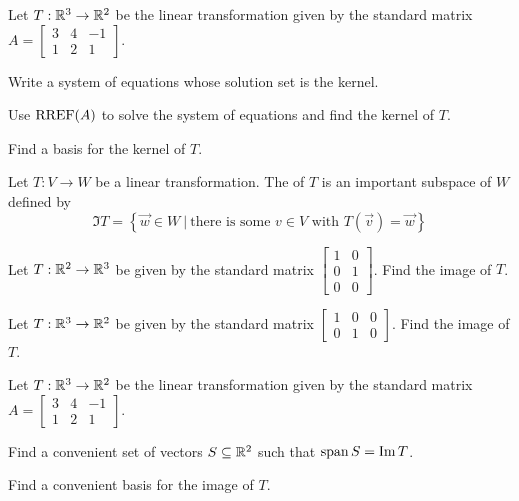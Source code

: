 \begin{applicationActivities}
\begin{activity}{10}
Let $T: \mathbb{R}^3 \rightarrow \mathbb{R}^2$ be the linear transformation given by the standard matrix $A=\begin{bmatrix} 3 & 4 & -1 \\ 1 & 2 & 1 \end{bmatrix}$.
\begin{subactivity}
Write a system of equations whose solution set is the kernel.
\end{subactivity}
\begin{subactivity}
Use $\operatorname{RREF}(A)$ to solve the system of equations and find the kernel of \(T\).
\end{subactivity}
\begin{subactivity}
Find a basis for the kernel of $T$.
\end{subactivity}
\end{activity}


\begin{definition}
Let $T: V \rightarrow W$ be a linear transformation.
The  of $T$ is an important subspace of \(W\) defined by
\[
\Im T = \left\{ \vec{w} \in W\ \big|\ \text{there is some }v\in V \text{ with } T(\vec{v})=\vec{w}\right\}
\]
\end{definition}

\begin{activity}{5}
Let $T: \mathbb{R}^2 \rightarrow \mathbb{R}^3$ be given by the standard matrix $\begin{bmatrix} 1 & 0 \\ 0 & 1 \\ 0 & 0 \end{bmatrix}$.  Find the image of $T$.
\end{activity}

\begin{activity}{5}
Let $T: \mathbb{R}^3 \rightarrow \mathbb{R}^2$ be given by the standard matrix $\begin{bmatrix} 1 & 0 &0  \\ 0 & 1 & 0 \end{bmatrix}$.  Find the image of $T$.
\end{activity}


\begin{activity}{10}
Let $T: \mathbb{R}^3 \rightarrow \mathbb{R}^2$ be the linear transformation given by the standard matrix $A=\begin{bmatrix} 3 & 4 & -1 \\ 1 & 2 & 1 \end{bmatrix}$.
\begin{subactivity}
Find a convenient set of vectors \(S\subseteq\mathbb{R}^2\) such that \(\operatorname{span} S=\operatorname{Im} T\).
\end{subactivity}
\begin{subactivity}
Find a convenient basis for the image of $T$.
\end{subactivity}
\end{activity}


\end{applicationActivities}
